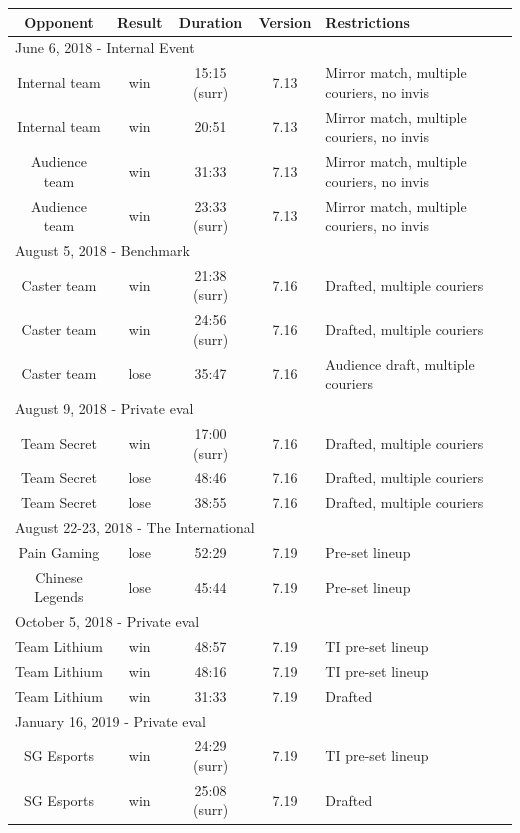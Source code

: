 \documentclass[ocean-paper.tex]{subfiles}
\begin{document}
\begin{table}
\begin{tabular}{c|c|c|c|l}
Opponent & Result & Duration & Version & Restrictions\\
\hline
\multicolumn{5}{l}{June 6, 2018 - Internal Event}\\
\hline
Internal team & win & 15:15 (surr) & 7.13 & Mirror match, multiple couriers, no invis\\
Internal team & win & 20:51 & 7.13 & Mirror match, multiple couriers, no invis\\
Audience team & win & 31:33 & 7.13 & Mirror match, multiple couriers, no invis\\
Audience team & win & 23:33 (surr) & 7.13 & Mirror match, multiple couriers, no invis\\
\hline
\multicolumn{5}{l}{August 5, 2018 - Benchmark}\\
\hline
Caster team & win & 21:38 (surr) & 7.16 & Drafted, multiple couriers\\
Caster team & win & 24:56 (surr) & 7.16 & Drafted, multiple couriers\\
Caster team & lose & 35:47 & 7.16 & Audience draft, multiple couriers\\
\hline
\multicolumn{5}{l}{August 9, 2018 - Private eval}\\
\hline
Team Secret & win & 17:00 (surr) & 7.16 & Drafted, multiple couriers\\
Team Secret & lose & 48:46 & 7.16 & Drafted, multiple couriers\\
Team Secret & lose & 38:55 & 7.16 & Drafted, multiple couriers\\
\hline
\multicolumn{5}{l}{August 22-23, 2018 - The International}\\
\hline
Pain Gaming & lose & 52:29 & 7.19 & Pre-set lineup\\
Chinese Legends & lose & 45:44 & 7.19 & Pre-set lineup\\
\hline
\multicolumn{5}{l}{October 5, 2018 - Private eval}\\
\hline
Team Lithium & win & 48:57 & 7.19 & TI pre-set lineup\\
Team Lithium & win & 48:16 & 7.19 & TI pre-set lineup\\
Team Lithium & win & 31:33 & 7.19 & Drafted\\
\hline
\multicolumn{5}{l}{January 16, 2019 - Private eval}\\
\hline
SG Esports & win & 24:29 (surr) & 7.19 & TI pre-set lineup\\
SG Esports & win & 25:08 (surr) & 7.19 & Drafted\\

\end{tabular}
\end{table}
\end{document}

